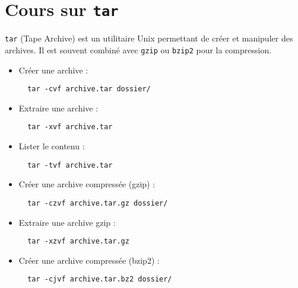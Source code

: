 \documentclass[a4paper,12pt]{article}
\begin{document}
\section*{Cours sur \texttt{tar}}

\begin{tcolorbox}[colback=green!5,colframe=green!75!black,title={Introduction}]
\texttt{tar} (Tape Archive) est un utilitaire Unix permettant de créer et manipuler des archives. 
Il est souvent combiné avec \texttt{gzip} ou \texttt{bzip2} pour la compression.
\end{tcolorbox}

\begin{tcolorbox}[colback=green!5,colframe=green!75!black,title={Commandes principales}]
\begin{itemize}
  \item Créer une archive :
  \begin{lstlisting}
  tar -cvf archive.tar dossier/
  \end{lstlisting}

  \item Extraire une archive :
  \begin{lstlisting}
  tar -xvf archive.tar
  \end{lstlisting}

  \item Lister le contenu :
  \begin{lstlisting}
  tar -tvf archive.tar
  \end{lstlisting}

  \item Créer une archive compressée (gzip) :
  \begin{lstlisting}
  tar -czvf archive.tar.gz dossier/
  \end{lstlisting}

  \item Extraire une archive gzip :
  \begin{lstlisting}
  tar -xzvf archive.tar.gz
  \end{lstlisting}

  \item Créer une archive compressée (bzip2) :
  \begin{lstlisting}
  tar -cjvf archive.tar.bz2 dossier/
  \end{lstlisting}
\end{itemize}
\end{tcolorbox}
\end{document}
